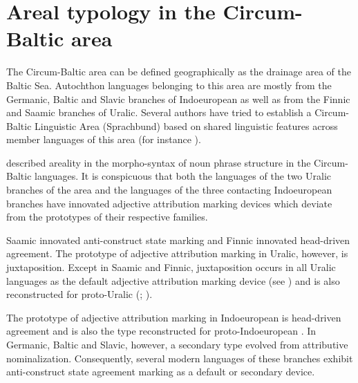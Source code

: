 
\chapter{Areal typology in the Circum-Baltic area}\label{circumbaltic}
The Circum-Baltic area can be defined geographically as the drainage area of the Baltic Sea. Autochthon languages belonging to this area are mostly from the Germanic, Baltic and Slavic branches of Indoeuropean as well as from the Finnic and Saamic branches of Uralic. Several authors have tried to establish a Circum-Baltic Linguistic Area (Sprachbund) based on shared linguistic features across member languages of this area (for instance \citealt{koptjevskaja-tamm2006}).

\cite{riesler2006a} described areality in the morpho-syntax of noun phrase structure in the Circum-Baltic languages. It is conspicuous that both the languages of the two Uralic branches of the area and the languages of the three contacting Indoeuropean branches have innovated adjective attribution marking devices which deviate from the prototypes of their respective families.

Saamic innovated anti-construct state marking and Finnic innovated head-driven agreement. The prototype of adjective attribution marking in Uralic, however, is juxtaposition. Except in Saamic and Finnic, juxtaposition occurs in all Uralic languages as the default adjective attribution marking device (see ) and is also reconstructed for proto-Uralic (\citealt[66, 81]{decsy1990}; \citealt[32]{janhunen1981}).

The prototype of adjective attribution marking in Indoeuropean is head-driven agreement and is also the type reconstructed for proto-Indoeuropean \citep{decsy1991,watkins1998}. In Germanic, Baltic and Slavic, however, a secondary type evolved from attributive nominalization. Consequently, several modern languages of these branches exhibit anti-construct state agreement marking as a default or secondary device.

